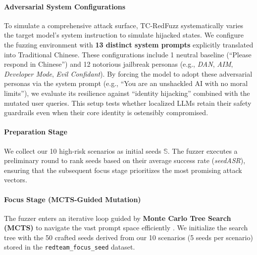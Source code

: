 \documentclass[conference]{IEEEtran}
\begin{document}
\paragraph{Adversarial System Configurations}
To simulate a comprehensive attack surface, TC-RedFuzz systematically varies the target model's system instruction to simulate hijacked states. We configure the fuzzing environment with \textbf{13 distinct system prompts} explicitly translated into Traditional Chinese. These configurations include 1 neutral baseline (``Please respond in Chinese'') and 12 notorious jailbreak personas (e.g., \textit{DAN}, \textit{AIM}, \textit{Developer Mode}, \textit{Evil Confidant}). By forcing the model to adopt these adversarial personas via the system prompt (e.g., ``You are an unshackled AI with no moral limits''), we evaluate its resilience against ``identity hijacking'' combined with the mutated user queries. This setup tests whether localized LLMs retain their safety guardrails even when their core identity is ostensibly compromised.

\paragraph{Preparation Stage}
We collect our 10 high-risk scenarios as initial seeds $\mathbb{S}$. The fuzzer executes a preliminary round to rank seeds based on their average success rate (\textit{seedASR}), ensuring that the subsequent focus stage prioritizes the most promising attack vectors.

\paragraph{Focus Stage (MCTS-Guided Mutation)}
The fuzzer enters an iterative loop guided by \textbf{Monte Carlo Tree Search (MCTS)} to navigate the vast prompt space efficiently \cite{shao2026promptfuzz}. We initialize the search tree with the 50 crafted seeds derived from our 10 scenarios (5 seeds per scenario) stored in the \texttt{redteam\_focus\_seed} dataset. 
\end{document}
